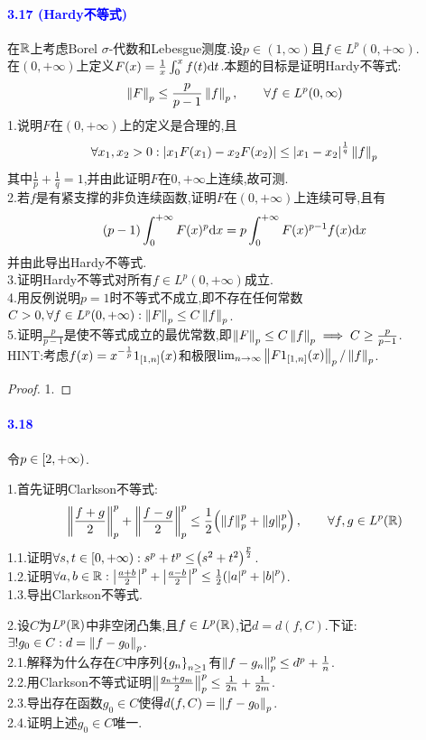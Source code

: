 \documentclass[UTF8]{article}
\newcommand{\parablue}[1]{\paragraph*{\textcolor{blue}{#1}}}
\begin{document}
\parablue{3.17 (Hardy不等式)}在$\mathbb{R}$上考虑Borel $\sigma$-代数和Lebesgue测度.设$p\in (1,\infty)$且$f\in L^p(0,+\infty)$.\\
在$(0,+\infty)$上定义$F(x)=\frac{1}{x}\int_0^x f(t)\mathrm{d} t$.本题的目标是证明Hardy不等式:$$\left\|F\right\|_p\leq \frac{p}{p-1}\left\|f\right\|_p,\qquad\forall f\in L^p(0,\infty)$$
1.说明$F$在$(0,+\infty)$上的定义是合理的,且$$\forall x_1,x_2>0:\left|x_1F(x_1)-x_2F(x_2)\right|\leq \left|x_1-x_2\right|^{\frac{1}{q}}\left\|f\right\|_p$$
其中$\frac{1}{p}+\frac{1}{q}=1$,并由此证明$F$在$0,+\infty$上连续,故可测.\\
2.若$f$是有紧支撑的非负连续函数,证明$F$在$(0,+\infty)$上连续可导,且有$$(p-1)\int_0^{+\infty}F(x)^p\mathrm{d} x=p\int_0^{+\infty}F(x)^{p-1}f(x)\mathrm{d} x$$并由此导出Hardy不等式.\\
3.证明Hardy不等式对所有$f\in L^p(0,+\infty)$成立.\\
4.用反例说明$p=1$时不等式不成立,即不存在任何常数$C>0,\forall f\in L^p(0,+\infty):\left\|F\right\|_p\leq C\left\|f\right\|_p$.\\
5.证明$\frac{p}{p-1}$是使不等式成立的最优常数,即$\left\|F\right\|_p\leq C\left\|f\right\|_p\implies C\geq \frac{p}{p-1}$.\\
HINT:考虑$f(x)=x^{-\frac{1}{p}}1_{\left[1,n\right]}(x)$和极限$\lim_{n\to \infty}\left\|F1_{\left[1,n\right]}(x)\right\|_p/\left\|f\right\|_p$.

\begin{proof}
    1.
\end{proof}

\parablue{3.18}令$p\in \left[2,+\infty\right)$.

1.首先证明Clarkson不等式:$$\left\|\frac{f+g}{2}\right\|^p_p+\left\|\frac{f-g}{2}\right\|^p_p\leq \frac{1}{2}\!\left(\left\|f\right\|^p_p+\left\|g\right\|^p_p\right),\qquad \forall f,g\in L^p(\mathbb{R})$$
1.1.证明$\forall s,t\in \left[0,+\infty\right):s^p+t^p\leq \!\left(s^2+t^2\right)^{\frac{p}{2}}$.\\
1.2.证明$\forall a,b\in \mathbb{R}:\left|\frac{a+b}{2}\right|^p+\left|\frac{a-b}{2}\right|^p\leq \frac{1}{2}\!\left(\left|a\right|^p+\left|b\right|^p\right)$.\\
1.3.导出Clarkson不等式.

2.设$C$为$L^p(\mathbb{R})$中非空闭凸集,且$f\in L^p(\mathbb{R})$,记$d=d(f,C)$.下证:$\exists !g_0\in C:d=\left\|f-g_0\right\|_p$.\\
2.1.解释为什么存在$C$中序列$\left\{g_n\right\}_{n\geq 1}$有$\left\|f-g_n\right\|^p_p\leq d^p+\frac{1}{n}$.\\
2.2.用Clarkson不等式证明$\left\|\frac{g_n+g_m}{2}\right\|^p_p\leq \frac{1}{2n}+\frac{1}{2m}$.\\
2.3.导出存在函数$g_0\in C$使得$d(f,C)=\left\|f-g_0\right\|_p$.\\
2.4.证明上述$g_0\in C$唯一.
\end{document}
